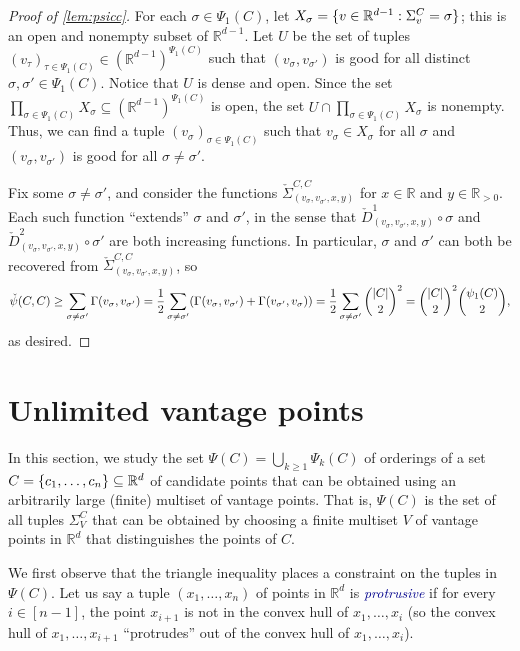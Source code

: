 \documentclass[11pt]{amsart}
\theoremstyle{definition}
\DeclarePairedDelimiter{\set}{\{}{\}}
\DeclarePairedDelimiter{\abs}{\lvert}{\rvert}
\newcommand{\RR}{\mathbb{R}}
\newcommand{\dfn}[1]{\textcolor{darkblue}{\emph{#1}}}
\begin{document}
\begin{proof}[Proof of \cref{lem:psicc}]
For each $\sigma \in \Psi_1(C)$, let $X_\sigma=\set{v\in\RR^{d-1}:\Sigma_v^C = \sigma}$; this is an open and nonempty subset of $\RR^{d-1}$. Let $U$ be the set of tuples $(v_\tau)_{\tau \in \Psi_1(C)} \in (\RR^{d-1})^{\Psi_1(C)}$ such that $(v_\sigma, v_{\sigma'})$ is good for all distinct $\sigma, \sigma' \in \Psi_1(C)$.  Notice that $U$ is dense and open.  Since the set $\prod_{\sigma \in \Psi_1(C)} X_\sigma\subseteq (\RR^{d-1})^{\Psi_1(C)}$ is open, the set $U \cap \prod_{\sigma \in \Psi_1(C)} X_\sigma$ is nonempty. Thus, we can find a tuple $(v_\sigma)_{\sigma \in \Psi_1(C)}$ such that $v_\sigma \in X_\sigma$ for all $\sigma$ and $(v_\sigma, v_{\sigma'})$ is good for all $\sigma \neq \sigma'$.

Fix some $\sigma \neq \sigma'$, and consider the functions $\check \Sigma_{(v_\sigma, v_{\sigma'}, x, y)}^{C,C}$ for $x \in \RR$ and $y \in \RR_{>0}$. Each such function ``extends'' $\sigma$ and $\sigma'$, in the sense that $\check D^1_{(v_\sigma, v_{\sigma'}, x, y)} \circ \sigma$ and $\check D^2_{(v_\sigma, v_{\sigma'}, x, y)} \circ \sigma'$
are both increasing functions. In particular, $\sigma$ and $\sigma'$ can both be recovered from $\check \Sigma_{(v_\sigma, v_{\sigma'}, x, y)}^{C,C}$, so
    \[
        \check \psi(C, C) \geq \sum_{\sigma \neq \sigma'} \Gamma(v_\sigma, v_{\sigma'}) 
        = \frac{1}{2} \sum_{\sigma \neq \sigma'} (\Gamma(v_\sigma, v_{\sigma'}) + \Gamma(v_{\sigma'}, v_\sigma)) 
        = \frac{1}{2} \sum_{\sigma \neq \sigma'} \binom{\abs{C}}{2}^2 
        = \binom{\abs{C}}{2}^2 \binom{\psi_1(C)}{2},
    \]
    as desired.
\end{proof}

\section{Unlimited vantage points}\label{sec:unlimited}

In this section, we study the set $\Psi(C)=\bigcup_{k\geq 1}\Psi_k(C)$ of orderings of a set $C=\set{c_1,\ldots,c_n}\subseteq\RR^d$ of candidate points that can be obtained using an arbitrarily large (finite) multiset of vantage points. That is, $\Psi(C)$ is the set of all tuples $\Sigma_V^C$ that can be obtained by choosing a finite multiset $V$ of vantage points in $\RR^d$ that distinguishes the points of $C$. 

We first observe that the triangle inequality places a constraint on the tuples in $\Psi(C)$. Let us say a tuple $(x_1,\ldots,x_n)$ of points in $\RR^d$ is \dfn{protrusive} if for every $i\in[n-1]$, the point $x_{i+1}$ is not in the convex hull of $x_1,\ldots,x_i$ (so the convex hull of $x_1,\ldots,x_{i+1}$ ``protrudes'' out of the convex hull of $x_1,\ldots,x_i$). 
\end{document}
